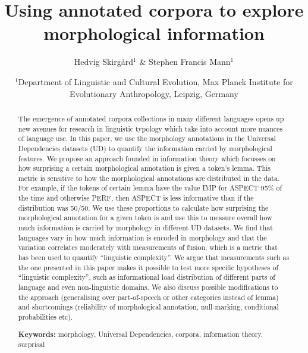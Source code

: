 \documentclass[a4paper]{article}
\title{Using annotated corpora to explore morphological information}
\author{Hedvig Skirgård$^1$ \& Stephen Francis Mann$^1$}
\date{
	$^1$Department of Linguistic and Cultural Evolution, Max Planck Institute for Evolutionary Anthropology, Leipzig, Germany\\%
}
\begin{document}
	\maketitle
	
	\begin{abstract}
    The emergence of annotated corpora collections in many different languages opens up new avenues for research in linguistic typology which take into account more nuances of language use.
    In this paper, we use the morphology annotations in the Universal Dependencies datasets (UD) to quantify the information carried by morphological features.
    We propose an approach founded in information theory which focusses on how surprising a certain morphological annotation is given a token's lemma.
    This metric is sensitive to how the morphological annotations are distributed in the data.
    For example, if the tokens of certain lemma have the value IMP for ASPECT 95\% of the time and otherwise PERF, then ASPECT is less informative than if the distribution was 50/50.
    We use these proportions to calculate how surprising the morphological annotation for a given token is and use this to measure overall how much information is carried by morphology in different UD datasets.
    We find that languages vary in how much information is encoded in morphology and that the variation correlates moderately with measurements of fusion, which is a metric that has been used to quantify ``linguistic complexity''.
    We argue that measurements such as the one presented in this paper makes it possible to test more specific hypotheses of ``linguistic complexity'', such as informational load distribution of different parts of language and even non-linguistic domains.
    We also discuss possible modifications to the approach (generalising over part-of-speech or other categories instead of lemma) and shortcomings (reliability of morphological annotation, null-marking, conditional probabilities etc). 
	
    \noindent\textbf{Keywords:} morphology, Universal Dependencies, corpora, information theory, surprisal
	\end{abstract}
\newpage
\tableofcontents


\newpage
\end{document}

